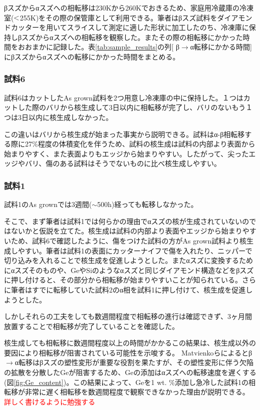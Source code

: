 βスズからαスズへの相転移は230Kから260Kでおきる\cite{Matvienko,Ogino,Cornelius}ため、家庭用冷蔵庫の冷凍室($\rm<$255K)をその際の保管庫として利用できる。筆者はβスズ試料をダイアモンドカッターを用いてスライスして測定に適した形状に加工したのち、冷凍庫に保持しβスズからαスズへの相転移を観察した。またその際の相転移にかかった時間をおおまかに記録した。表\ref{tab:sample_results}の列[ β$\to$α転移にかかる時間] にβスズからαスズへの転移にかかった時間をまとめる。

\subsubsection{試料6}
試料6はカットしたAs grown試料を2つ用意し冷凍庫の中に保持した。１つはカットした際のバリから核生成して3日以内に相転移が完了し、バリのないもう１つは3日以内に核生成しなかった。

この違いはバリから核生成が始まった事実から説明できる。試料はα-β相転移する際に27\%程度の体積変化を伴うため、試料の核生成は試料の内部より表面から始まりやすく、また表面よりもエッジから始まりやすい\cite{Cornelius}。したがって、尖ったエッジやバリ、傷のある試料はそうでないものに比べ核生成しやすい。

\subsubsection{試料1}
試料1のAs grownでは3週間($\sim$500h)経っても転移しなかった。

そこで、まず筆者は試料1では何らかの理由でαスズの核が生成されていないのではないかと仮説を立てた。核生成は試料の内部より表面やエッジから始まりやすい\cite{Cornelius}ため、試料6で確認したように、傷をつけた試料の方がAs grown試料より核生成しやすい。筆者は試料1の表面にカッターナイフで傷を入れたり、ニッパーで切り込みを入れることで核生成を促進しようとした。またαスズに変換するためにαスズそのものや、GeやSiのようなαスズと同じダイアモンド構造などをβスズに押し付けると、その部分から相転移が始まりやすいことが知られている\cite{Cornelius}。さらに筆者はすでに転移していた試料2のα相を試料1に押し付けて、核生成を促進しようとした。

しかしそれらの工夫をしても数週間程度で相転移の進行は確認できず、3ヶ月間放置することで相転移が完了していることを確認した。

核生成しても相転移に数週間程度以上の時間がかかるこの結果は、核生成以外の要因により相転移が阻害されている可能性を示唆する。
Matvienkoら\cite{Matvienko}によるとβ$\to$α転移はβスズの塑性変形が重要な役割を果たすが、その塑性変形に伴う欠陥の拡散を分散したGeが阻害するため、Geの添加はαスズへの転移速度を遅くする(図\ref{fig:Ge_content})。この結果によって、Geを1 wt. \%添加し急冷した試料1の相転移が非常に遅く相転移を数週間程度で観察できなかった理由が説明できる。
\textcolor{red}{詳しく書けるように勉強する}

